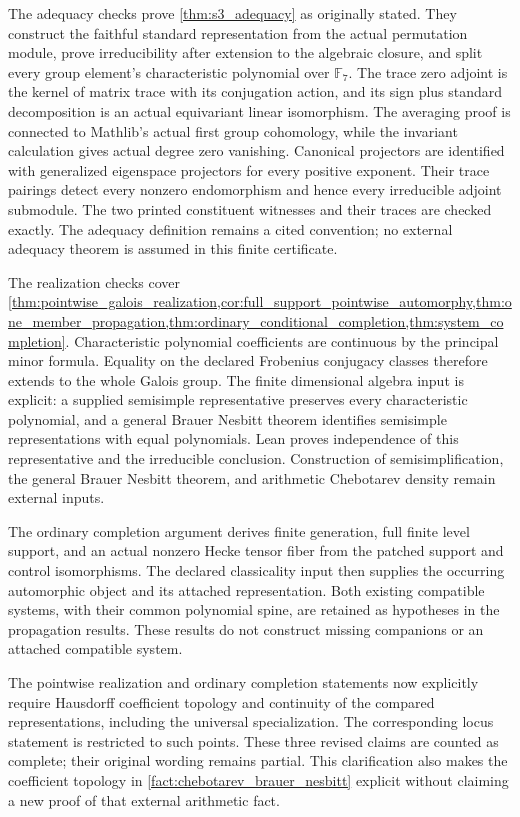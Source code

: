 \documentclass[11pt]{amsart}
\theoremstyle{definition}
\theoremstyle{remark}
\newcommand{\FF}{\mathbb F}
\begin{document}
The adequacy checks prove \cref{thm:s3_adequacy} as originally stated. They construct the faithful standard representation from the actual permutation module, prove irreducibility after extension to the algebraic closure, and split every group element's characteristic polynomial over \(\FF_7\). The trace zero adjoint is the kernel of matrix trace with its conjugation action, and its sign plus standard decomposition is an actual equivariant linear isomorphism. The averaging proof is connected to Mathlib's actual first group cohomology, while the invariant calculation gives actual degree zero vanishing. Canonical projectors are identified with generalized eigenspace projectors for every positive exponent. Their trace pairings detect every nonzero endomorphism and hence every irreducible adjoint submodule. The two printed constituent witnesses and their traces are checked exactly. The adequacy definition remains a cited convention; no external adequacy theorem is assumed in this finite certificate.

The realization checks cover \cref{thm:pointwise_galois_realization,cor:full_support_pointwise_automorphy,thm:one_member_propagation,thm:ordinary_conditional_completion,thm:system_completion}. Characteristic polynomial coefficients are continuous by the principal minor formula. Equality on the declared Frobenius conjugacy classes therefore extends to the whole Galois group. The finite dimensional algebra input is explicit: a supplied semisimple representative preserves every characteristic polynomial, and a general Brauer Nesbitt theorem identifies semisimple representations with equal polynomials. Lean proves independence of this representative and the irreducible conclusion. Construction of semisimplification, the general Brauer Nesbitt theorem, and arithmetic Chebotarev density remain external inputs.

The ordinary completion argument derives finite generation, full finite level support, and an actual nonzero Hecke tensor fiber from the patched support and control isomorphisms. The declared classicality input then supplies the occurring automorphic object and its attached representation. Both existing compatible systems, with their common polynomial spine, are retained as hypotheses in the propagation results. These results do not construct missing companions or an attached compatible system.

The pointwise realization and ordinary completion statements now explicitly require Hausdorff coefficient topology and continuity of the compared representations, including the universal specialization. The corresponding locus statement is restricted to such points. These three revised claims are counted as complete; their original wording remains partial. This clarification also makes the coefficient topology in \cref{fact:chebotarev_brauer_nesbitt} explicit without claiming a new proof of that external arithmetic fact.
\end{document}
